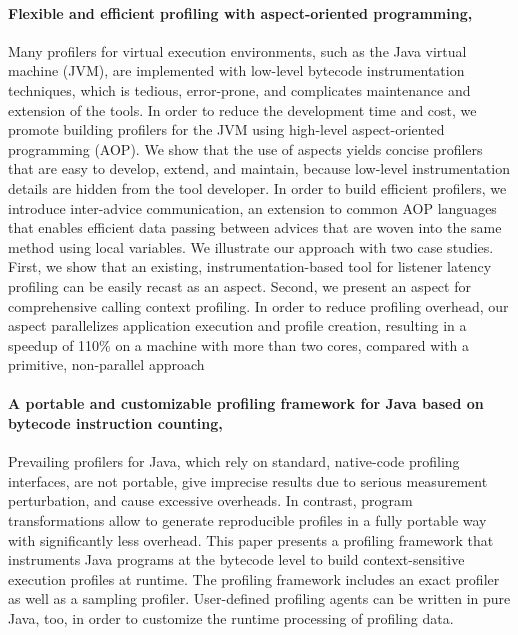 \paragraph{Flexible and efficient profiling with aspect-oriented programming, \cite{Binder:2006:FEM:1173706.1173733}}
Many profilers for virtual execution environments, such as the Java virtual machine (JVM), are implemented with low-level bytecode instrumentation techniques, which is tedious, error-prone, and complicates maintenance and extension of the tools.
In order to reduce the development time and cost, we promote building profilers for the JVM using high-level aspect-oriented programming (AOP).
We show that the use of aspects yields concise profilers that are easy to develop, extend, and maintain, because low-level
instrumentation details are hidden from the tool developer.
In order to build efficient profilers, we introduce inter-advice communication, an extension to common AOP languages that enables efficient data passing
between advices that are woven into the same method using local variables.
We illustrate our approach with two case studies.
First, we show that an existing, instrumentation-based tool for listener latency
profiling can be easily recast as an aspect.
Second, we present an aspect for comprehensive calling context profiling.
In order to reduce profiling overhead, our aspect parallelizes application execution and profile
creation, resulting in a speedup of 110\% on a machine with more than two cores, compared with a primitive, non-parallel approach
\paragraph{A portable and customizable profiling framework for Java based on bytecode instruction counting, \cite{Binder2005}}
Prevailing profilers for Java, which rely on standard, native-code profiling interfaces, are not portable, give imprecise results due to serious measurement perturbation, and cause excessive overheads.
In contrast, program transformations allow to generate reproducible profiles in a fully portable way with significantly less overhead.
This paper presents a profiling framework that instruments Java programs at the bytecode level to build context-sensitive execution profiles at runtime.
The profiling framework includes an exact profiler as well as a sampling profiler.
User-defined profiling agents can be written in pure Java, too, in order to customize the runtime processing of profiling data.
